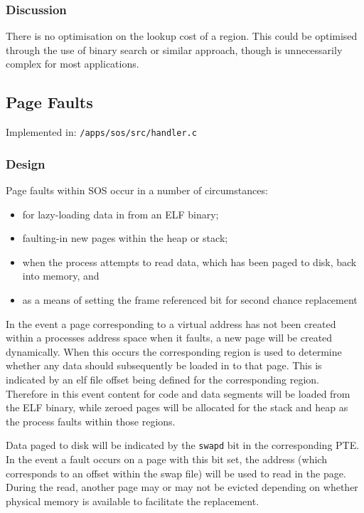 \documentclass[a4paper,12pt]{article}
\begin{document}
\subsubsection{Discussion}
There is no optimisation on the lookup cost of a region.  This could be
optimised through the use of binary search or similar approach, though is
unnecessarily complex for most applications.

\subsection{Page Faults}
Implemented in: \texttt{/apps/sos/src/handler.c}

\subsubsection{Design}
Page faults within SOS occur in a number of circumstances:

\begin{itemize}
\item for lazy-loading data in from an ELF binary;
\item faulting-in new pages within the heap or stack;
\item when the process attempts to read data, which has been paged to disk,
  back into memory, and
\item as a means of setting the frame referenced bit for second chance replacement
\end{itemize}

In the event a page corresponding to a virtual address has not been created
within a processes address space when it faults, a new page will be created
dynamically.  When this occurs the corresponding region is used to determine
whether any data should subsequently be loaded in to that page.  This is
indicated by an elf file offset being defined for the corresponding region.
Therefore in this event content for code and data segments will be loaded from
the ELF binary, while zeroed pages will be allocated for the stack and heap as
the process faults within those regions.

Data paged to disk will be indicated by the \texttt{swapd} bit in the corresponding
PTE.  In the event a fault occurs on a page with this bit set, the address
(which corresponds to an offset within the swap file) will be used to read in
the page.  During the read, another page may or may not be evicted depending
on whether physical memory is available to facilitate the replacement.
\end{document}
